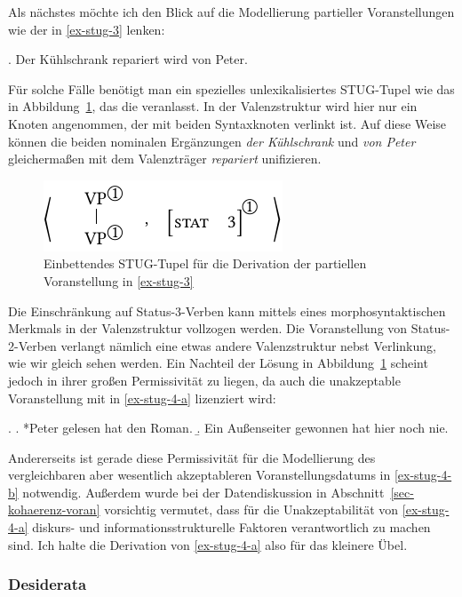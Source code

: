 Als nächstes möchte ich den Blick auf die Modellierung partieller Voranstellungen wie der in \ref{ex-stug-3} lenken: 

\ex. \label{ex-stug-3}Der Kühlschrank repariert wird von Peter.

Für solche Fälle benötigt man ein spezielles unlexikalisiertes STUG-Tupel wie das in Abbildung~\ref{fig-stug-6}, das die  veranlasst. In der Valenzstruktur wird hier nur ein Knoten angenommen, der mit beiden Syntaxknoten verlinkt ist. Auf diese Weise können die beiden nominalen Ergänzungen {\it der Kühlschrank} und {\it von Peter} gleicherma\ss en mit dem Valenzträger {\it repariert} unifizieren.
\begin{figure}[t]
\centering
\includegraphics{graphics/abb96.pdf}
\caption{\label{fig-stug-6}Einbettendes STUG-Tupel für die Derivation der partiellen Voranstellung in \ref{ex-stug-3}}
\end{figure}
Die Einschränkung auf Status-3-Verben kann mittels eines morphosyntaktischen Merkmals in der Valenzstruktur vollzogen werden. Die Voranstellung von Status-2-Verben verlangt nämlich eine etwas andere Valenzstruktur nebst Verlinkung, wie wir gleich sehen werden. Ein Nachteil der Lösung in Abbildung~\ref{fig-stug-6} scheint jedoch in ihrer gro\ss en Permissivität zu liegen, da auch die unakzeptable Voranstellung mit  in \ref{ex-stug-4-a} lizenziert wird:   

\ex. \label{ex-stug-4}
\a. *Peter gelesen hat den Roman. \hfill \citep[Abbildung~6]{Gerdes:04}\label{ex-stug-4-a}
\b. Ein Au\ss enseiter gewonnen hat hier noch nie. \hfill \citep[10-d]{Haider:90}\label{ex-stug-4-b}

\largerpage%
Andererseits ist gerade diese Permissivität für die Modellierung des vergleichbaren aber wesentlich akzeptableren Voranstellungsdatums in \ref{ex-stug-4-b} notwendig. Au\ss erdem wurde bei der Datendiskussion in Abschnitt~\ref{sec-kohaerenz-voran} vorsichtig vermutet, dass für die Unakzeptabilität von \ref{ex-stug-4-a} diskurs- und informationsstrukturelle Faktoren verantwortlich zu machen sind. Ich halte die Derivation von \ref{ex-stug-4-a} also für das kleinere Übel.

\subsubsection*{Desiderata}

